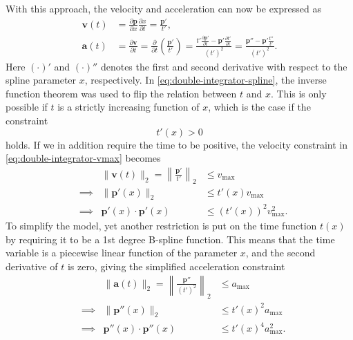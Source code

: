 With this approach, the velocity and acceleration can now be expressed as
\begin{subequations}\label{eq:double-integrator-spline}
    \begin{align}
        \mathbf{v}(t) &= \frac{\partial \mathbf{p}}{\partial x} \frac{\partial x}{\partial t} = \frac{\mathbf{p}'}{t'},
        \label{eq:double-integrator-v-spline} \\
        \mathbf{a}(t) &= \frac{\partial \mathbf{v}}{\partial t} = \frac{\partial}{\partial t} \left(\frac{\mathbf{p}'}{t'}\right) = 
        \frac{
            t'\frac{\partial \mathbf{p}'}{\partial t} - \mathbf{p}'\frac{\partial t'}{\partial t}
            }{(t')^2} = 
        \frac{\mathbf{p}'' - \mathbf{p}'\frac{t''}{t'}}{(t')^2}.
        \label{eq:double-integrator-a-spline}
    \end{align}
\end{subequations}
Here $(\cdot)'$ and $(\cdot)''$ denotes the first and second derivative with respect to the spline parameter $x$, respectively. In \cref{eq:double-integrator-spline}, the inverse function theorem was used to flip the relation between $t$ and $x$. This is only possible if $t$ is a strictly increasing function of $x$, which is the case if the constraint 
\begin{equation}\label{eq:constraint-t}
    t'(x) > 0
\end{equation}
holds.  
If we in addition require the time to be positive, the velocity constraint in \cref{eq:double-integrator-vmax} becomes
\begin{equation}\label{eq:double-integrator-vmax-spline}
    \begin{aligned}
        &&\|\mathbf{v}(t)\|_2 = \left\|\frac{\mathbf{p}'}{t'}\right\|_2 &\leq v_{\max} \\
        &\implies& \|\mathbf{p}'(x)\|_2 &\leq t'(x)v_{\max} \\
        &\implies& \mathbf{p}'(x)\cdot\mathbf{p}'(x) &\leq (t'(x))^2v_{\max}^2.
    \end{aligned}
\end{equation}
To simplify the model, yet another restriction is put on the time function $t(x)$ by requiring it to be a 1st degree B-spline function. This means that the time variable is a piecewise linear function of the parameter $x$, and the second derivative of $t$ is zero, giving the simplified acceleration constraint
\begin{equation}\label{eq:double-integrator-a-spline-simplified}
    \begin{aligned}
        &&\|\mathbf{a}(t)\|_2 = \left\|\frac{\mathbf{p}''}{(t')^2}\right\|_2 &\leq a_{\max} \\
        &\implies& \|\mathbf{p}''(x)\|_2 &\leq t'(x)^2a_{\max} \\
        &\implies& \mathbf{p}''(x)\cdot\mathbf{p}''(x) &\leq t'(x)^4a_{\max}^2.
    \end{aligned}
\end{equation}

